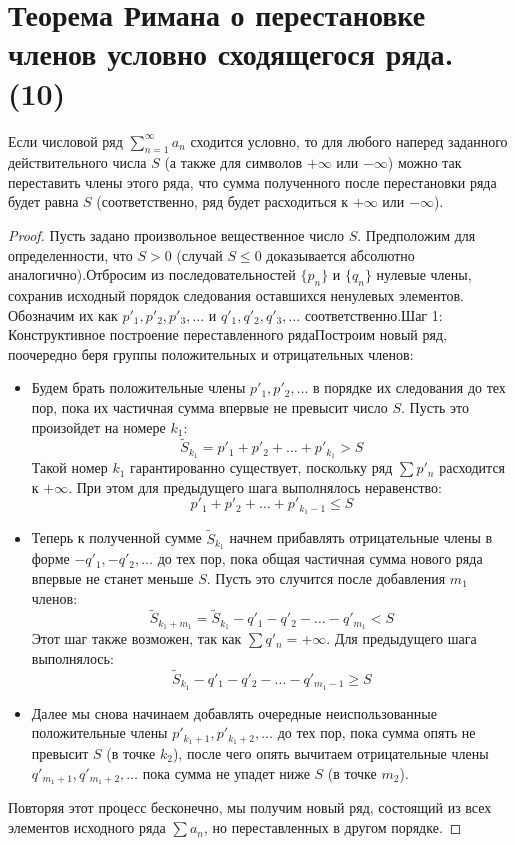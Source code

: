 \documentclass[14pt]{extreport}
\begin{document}
    \chapter{Теорема Римана о перестановке членов условно сходящегося ряда. (10)}
    \begin{theorem}
        Если числовой ряд $\sum_{n=1}^{\infty} a_n$ сходится условно, то для любого наперед заданного действительного числа $S$ (а также для символов $+\infty$ или $-\infty$) можно так переставить члены этого ряда, что сумма полученного после перестановки ряда будет равна $S$ (соответственно, ряд будет расходиться к $+\infty$ или $-\infty$).
    \end{theorem}

    \begin{proof}
        Пусть задано произвольное вещественное число $S$. Предположим для определенности, что $S > 0$ (случай $S \le 0$ доказывается абсолютно аналогично).Отбросим из последовательностей $\{p_n\}$ и $\{q_n\}$ нулевые члены, сохранив исходный порядок следования оставшихся ненулевых элементов. Обозначим их как $p'_1, p'_2, p'_3, \dots$ и $q'_1, q'_2, q'_3, \dots$ соответственно.Шаг 1: Конструктивное построение переставленного рядаПостроим новый ряд, поочередно беря группы положительных и отрицательных членов:

        \begin{itemize}
            \item Будем брать положительные члены $p'_1, p'_2, \dots$ в порядке их следования до тех пор, пока их частичная сумма впервые не превысит число $S$. Пусть это произойдет на номере $k_1$:$$\tilde{S}_{k_1} = p'_1 + p'_2 + \dots + p'_{k_1} > S$$
            Такой номер $k_1$ гарантированно существует, поскольку ряд $\sum p'_n$ расходится к $+\infty$. При этом для предыдущего шага выполнялось неравенство:$$p'_1 + p'_2 + \dots + p'_{k_1-1} \le S$$
            \item Теперь к полученной сумме $\tilde{S}_{k_1}$ начнем прибавлять отрицательные члены в форме $-q'_1, -q'_2, \dots$ до тех пор, пока общая частичная сумма нового ряда впервые не станет меньше $S$. Пусть это случится после добавления $m_1$ членов:$$\tilde{S}_{k_1+m_1} = \tilde{S}_{k_1} - q'_1 - q'_2 - \dots - q'_{m_1} < S$$Этот шаг также возможен, так как $\sum q'_n = +\infty$. Для предыдущего шага выполнялось:$$\tilde{S}_{k_1} - q'_1 - q'_2 - \dots - q'_{m_1-1} \ge S$$
            \item Далее мы снова начинаем добавлять очередные неиспользованные положительные члены $p'_{k_1+1}, p'_{k_1+2}, \dots$ до тех пор, пока сумма опять не превысит $S$ (в точке $k_2$), после чего опять вычитаем отрицательные члены $q'_{m_1+1}, q'_{m_1+2}, \dots$ пока сумма не упадет ниже $S$ (в точке $m_2$).
        \end{itemize}

        Повторяя этот процесс бесконечно, мы получим новый ряд, состоящий из всех элементов исходного ряда $\sum a_n$, но переставленных в другом порядке.
    \end{proof}
\end{document}
